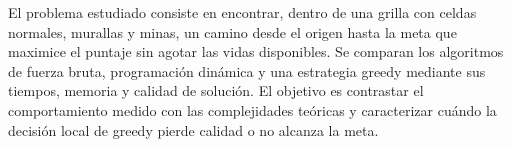 El problema estudiado consiste en encontrar, dentro de una grilla con celdas normales, murallas y minas, 
un camino desde el origen hasta la meta que maximice el puntaje sin agotar las vidas disponibles. 
Se comparan los algoritmos de fuerza bruta, programación dinámica y 
una estrategia greedy mediante sus tiempos, memoria y calidad de solución. 
El objetivo es contrastar el comportamiento medido con las complejidades teóricas
 y caracterizar cuándo la decisión local de greedy pierde calidad o no alcanza la meta.